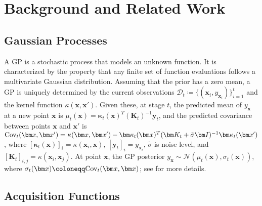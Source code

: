 \section{Background and Related Work}
\label{sec:related-work}
\subsection{Gaussian Processes}
A \ac{GP} is a stochastic process that models an unknown function. 
It is characterized by the property that any finite set of function evaluations follows a multivariate Gaussian distribution. 
Assuming that the prior has a zero mean, a \ac{GP} is uniquely determined by the current observations $\mathcal{D}_t\coloneqq\{(\bm x_i, y_{\bm x_i})\}_{i=1}^t$ and the kernel function $\kappa(\bm x, \bm x')$. 
Given these, at stage $t$, the predicted mean of $y_{\bm{x}}$ at a new point $\bm x$ is $\mu_t(\bm x) = \bm\kappa_t(\bm x)^T (\bm K_t)^{-1} \bm y_t$, and the predicted covariance between points $\bm x$ and $\bm x'$ is $\textup{Cov}_t(\bm x, \bm x') = \kappa(\bm x, \bm x') - \bm\kappa_t(\bm x)^T (\bm K_t+\tilde{\sigma}\bm I)^{-1} \bm\kappa_t(\bm x')$,
where $[\bm\kappa_t(\bm x)]_i = \kappa(\bm x_i, \bm x)$, $[\bm y_t]_i = y_{\bm x_i}$, $\tilde{\sigma}$ is noise level, and $[\bm K_t]_{i, j} = \kappa(\bm x_i, \bm x_j)$. At point $\bm x$, the \ac{GP} posterior $y_{\bm x}\sim\mathcal{N}(\mu_t(\bm x), \sigma_t(\bm x))$, where $\sigma_t(\bm x)\coloneqq \textup{Cov}_t(\bm x, \bm x)$; see \citet{rasmussen2006gaussian} for more details. 


\subsection{Acquisition Functions}
